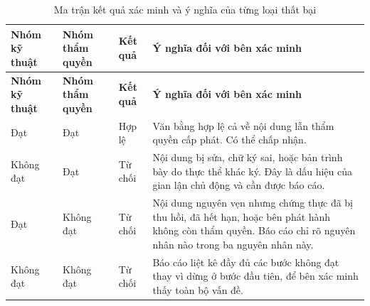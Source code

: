 \begin{longtable}{|p{2.3cm}|p{2.6cm}|p{2.2cm}|p{6.2cm}|}
\caption{Ma trận kết quả xác minh và ý nghĩa của từng loại thất bại}
\label{tab:verification-matrix} \\

\hline
\textbf{Nhóm kỹ thuật} & \textbf{Nhóm thẩm quyền} & \textbf{Kết quả} & \textbf{Ý nghĩa đối với bên xác minh} \\
\hline
\endfirsthead

\hline
\textbf{Nhóm kỹ thuật} & \textbf{Nhóm thẩm quyền} & \textbf{Kết quả} & \textbf{Ý nghĩa đối với bên xác minh} \\
\hline
\endhead

\hline
\endfoot

\hline
\endlastfoot

Đạt & Đạt & Hợp lệ
& Văn bằng hợp lệ cả về nội dung lẫn thẩm quyền cấp phát. Có thể chấp nhận.
\\ \hline

Không đạt & Đạt & Từ chối
& Nội dung bị sửa, chữ ký sai, hoặc bản trình bày do thực thể khác ký. Đây là dấu hiệu của gian lận chủ động và cần được báo cáo.
\\ \hline

Đạt & Không đạt & Từ chối
& Nội dung nguyên vẹn nhưng chứng thực đã bị thu hồi, đã hết hạn, hoặc bên phát hành không còn thẩm quyền. Báo cáo chỉ rõ nguyên nhân nào trong ba nguyên nhân này.
\\ \hline

Không đạt & Không đạt & Từ chối
& Báo cáo liệt kê đầy đủ các bước không đạt thay vì dừng ở bước đầu tiên, để bên xác minh thấy toàn bộ vấn đề.
\\ \hline

\end{longtable}
